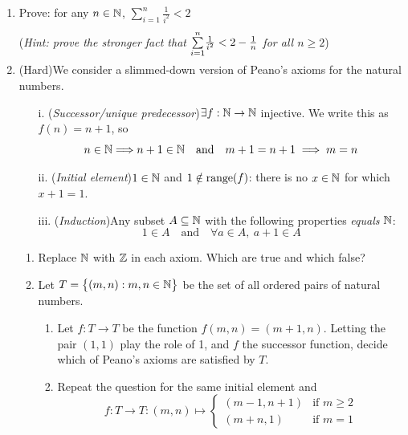 \begin{exercises}
\begin{enumerate}
		
		



	
	\item Prove: for any $n\in\mathbb{N}$, $\sum\limits_{i=1}^n\frac{1}{i^2}<2$\par
	(\emph{Hint: prove the stronger fact that $\smash{\sum\limits_{i=1}^n} \frac{1}{i^2} < 2 - \frac{1}{n}$ for all $n \ge 2$})
		
	
  \item\label{exs:peano} (Hard)\lstsp We consider a slimmed-down version of Peano's axioms for the natural numbers.
	\begin{itemize}
		\item[i.] (\emph{Successor/unique predecessor})\lstsp $\exists f:\mathbb{N}\to\mathbb{N}$ injective. We write this as $f(n)=n+1$, so
		\[
			n\in\mathbb{N}\Longrightarrow n+1\in\mathbb{N}\quad\text{and}\quad m+1=n+1\implies m=n
		\]
		\item[ii.] (\emph{Initial element})\lstsp $1\in\mathbb{N}$ and $1\notin\operatorname{range}(f)$: there is no $x\in\mathbb{N}$ for which $x+1=1$.
		\item[iii.] (\emph{Induction})\lstsp Any subset $A\subseteq\mathbb{N}$ with the following properties \emph{equals} $\mathbb{N}$:\footnotemark
		\[
			1\in A\quad\text{and}\quad \forall a\in A,\ a+1\in A
		\]
	\end{itemize}
	\begin{enumerate}
		\item Replace $\mathbb{N}$ with $\mathbb{Z}$ in each axiom. Which are true and which false?
		\item Let $T=\bigl\{(m,n):m,n\in\mathbb{N}\bigr\}$ be the set of all ordered pairs of natural numbers.
		\begin{enumerate}
		  \item Let $f:T\to T$ be the function $f(m,n)=(m+1,n)$. Letting the pair $(1,1)$ play the role of 1, and $f$ the successor function, decide which of Peano's axioms are satisfied by $T$.
			\item Repeat the question for the same initial element and 
			\[
				f:T\to T:(m,n)\mapsto
				\begin{cases}
					(m-1,n+1)&\text{if }m\ge 2\\
					(m+n,1)&\text{if }m=1
				\end{cases}
			\]
		\end{enumerate}
		

\end{enumerate}
\end{enumerate}
\end{exercises}
